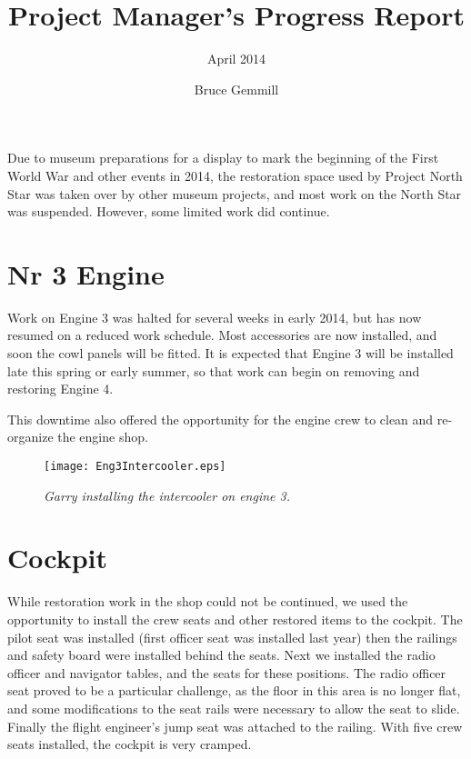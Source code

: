 %


\title{Project Manager's Progress Report}
\subtitle{April 2014}
\author{Bruce Gemmill}

\maketitle

Due to museum preparations for a display to mark the beginning of
the First World War and other events in 2014, the restoration
space used by Project North Star was taken over by other museum
projects, and most work on the North Star was suspended.
However, some limited work did continue.

\section{Nr 3 Engine}
\label{sec:engines_3}

Work on Engine 3 was halted for several weeks in early 2014, but
has now resumed on a reduced work schedule.  Most accessories are
now installed, and soon the cowl panels will be fitted.  It is
expected that Engine 3 will be installed late this spring or
early summer, so that work can begin on removing and restoring
Engine 4.

This downtime also offered the opportunity for the engine crew to
clean and re-organize the engine shop.

\begin{figure}[htbp]
   \vspace{2em}
   \centering
   \texttt{[image: Eng3Intercooler.eps]}
   \caption*{\small \em Garry installing the intercooler on engine 3.}
   \label{fig:Eng3Intercooler}
\end{figure}

\section{Cockpit}
\label{cockpit}

While restoration work in the shop could not be continued, we
used the opportunity to install the crew seats and other restored
items to the cockpit.  The pilot seat was installed (first
officer seat was installed last year) then the railings and
safety board were installed behind the seats.  Next we installed
the radio officer and navigator tables, and the seats for these
positions.  The radio officer seat proved to be a particular
challenge, as the floor in this area is no longer flat, and some
modifications to the seat rails were necessary to allow the seat
to slide.  Finally the flight engineer’s jump seat was attached
to the railing.  With five crew seats installed, the cockpit is
very cramped.

